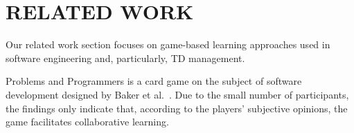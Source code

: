 \section{RELATED WORK}
\label{sec:RelatedWork}
        Our related work section focuses on game-based learning approaches used in software engineering and, particularly, TD management.
        

        Problems and Programmers is a card game on the subject of software development designed by Baker et al.~\cite{baker_problems_2003}. 
        Due to the small number of participants, the findings only indicate that, according to the players' subjective opinions, the game facilitates collaborative learning.

